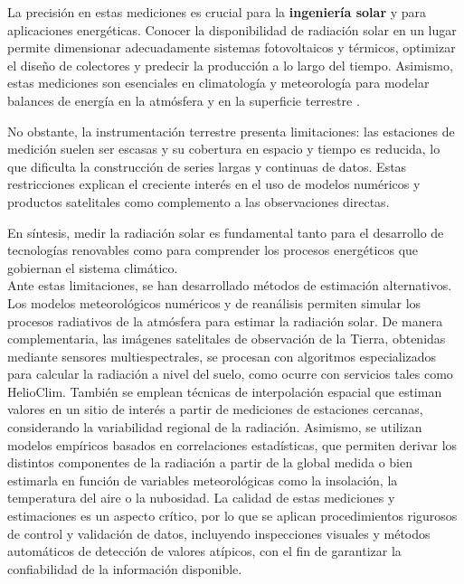 La precisión en estas mediciones es crucial para la \textbf{ingeniería solar} y para aplicaciones energéticas. Conocer la disponibilidad de radiación solar en un lugar permite dimensionar adecuadamente sistemas fotovoltaicos y térmicos, optimizar el diseño de colectores y predecir la producción a lo largo del tiempo. Asimismo, estas mediciones son esenciales en climatología y meteorología para modelar balances de energía en la atmósfera y en la superficie terrestre \citep{wald2018, ieapvps2023}.  

No obstante, la instrumentación terrestre presenta limitaciones: las estaciones de medición suelen ser escasas y su cobertura en espacio y tiempo es reducida, lo que dificulta la construcción de series largas y continuas de datos. Estas restricciones explican el creciente interés en el uso de modelos numéricos y productos satelitales como complemento a las observaciones directas.  

En síntesis, medir la radiación solar es fundamental tanto para el desarrollo de tecnologías renovables como para comprender los procesos energéticos que gobiernan el sistema climático.\\



Ante estas limitaciones, se han desarrollado métodos de estimación alternativos. Los modelos meteorológicos numéricos y de reanálisis permiten simular los procesos radiativos de la atmósfera para estimar la radiación solar. De manera complementaria, las imágenes satelitales de observación de la Tierra, obtenidas mediante sensores multiespectrales, se procesan con algoritmos especializados para calcular la radiación a nivel del suelo, como ocurre con servicios tales como HelioClim. También se emplean técnicas de interpolación espacial que estiman valores en un sitio de interés a partir de mediciones de estaciones cercanas, considerando la variabilidad regional de la radiación. Asimismo, se utilizan modelos empíricos basados en correlaciones estadísticas, que permiten derivar los distintos componentes de la radiación a partir de la global medida o bien estimarla en función de variables meteorológicas como la insolación, la temperatura del aire o la nubosidad. La calidad de estas mediciones y estimaciones es un aspecto crítico, por lo que se aplican procedimientos rigurosos de control y validación de datos, incluyendo inspecciones visuales y métodos automáticos de detección de valores atípicos, con el fin de garantizar la confiabilidad de la información disponible.





